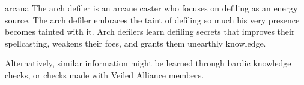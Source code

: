 {%



}
{}
{arcana}
{The arch defiler is an arcane caster who focuses on defiling as an energy source.}
{The arch defiler embraces the taint of defiling so much his very presence becomes tainted with it.}
{Arch defilers learn defiling secrets that improves their spellcasting, weakens their foes, and grants them unearthly knowledge.}

Alternatively, similar information might be learned through bardic knowledge checks, or  checks made with Veiled Alliance members.